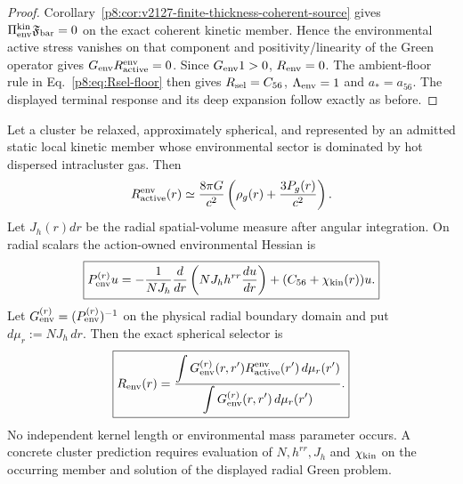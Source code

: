 \documentclass[12pt,a4paper]{article}
\begin{document}
\begin{proof}
Corollary~\ref{p8:cor:v2127-finite-thickness-coherent-source} gives
$\Pi_{\rm env}^{\rm kin}\mathfrak F_{\rm bar}=0$ on the exact coherent
kinetic member.  Hence the environmental active stress vanishes on that
component and positivity/linearity of the Green operator gives
$G_{\rm env}R_{\rm active}^{\rm env}=0$.  Since $G_{\rm env}1>0$,
$R_{\rm env}=0$.  The ambient-floor rule in
Eq.~\eqref{p8:eq:Rsel-floor} then gives $R_{\rm sel}=C_{56}$,
$\Lambda_{\rm env}=1$ and $a_*=a_{56}$.  The displayed terminal response and
its deep expansion follow exactly as before.
\end{proof}

\begin{corollary}
\label{p8:cor:relaxed-spherical-cluster-halo-limit}
Let a cluster be relaxed, approximately spherical, and represented by an
admitted static local kinetic member whose environmental sector is dominated by
hot dispersed intracluster gas.  Then
\begin{equation}
\label{p8:eq:cluster-active-gas-scalar}
 R_{\rm active}^{\rm env}(r)
 \simeq
 \frac{8\pi G}{c^2}
 \left(\rho_g(r)+\frac{3P_g(r)}{c^2}\right).
\end{equation}
Let $J_h(r)dr$ be the radial spatial-volume measure after angular integration.
On radial scalars the action-owned environmental Hessian is
\begin{equation}
\label{p8:eq:v2129-radial-environment-hessian}
\boxed{
 P_{\rm env}^{(r)}u
 =-\frac{1}{N J_h}\frac{d}{dr}
 \left(NJ_hh^{rr}\frac{du}{dr}\right)
 +(C_{56}+\chi_{\rm kin}(r))u .}
\end{equation}
Let $G_{\rm env}^{(r)}=(P_{\rm env}^{(r)})^{-1}$ on the physical radial
boundary domain and put $d\mu_r:=NJ_h\,dr$.  Then the exact spherical
selector is
\begin{equation}
\label{p8:eq:relaxed-cluster-radial-green-selector}
\boxed{
 R_{\rm env}(r)
 =\frac{\displaystyle\int
 G_{\rm env}^{(r)}(r,r')R_{\rm active}^{\rm env}(r')\,d\mu_r(r')}
 {\displaystyle\int
 G_{\rm env}^{(r)}(r,r')\,d\mu_r(r')}.}
\end{equation}
No independent kernel length or environmental mass parameter occurs.  A
concrete cluster prediction requires evaluation of $N,h^{rr},J_h$ and
$\chi_{\rm kin}$ on the occurring member and solution of the displayed radial
Green problem.


\end{corollary}
\end{document}

